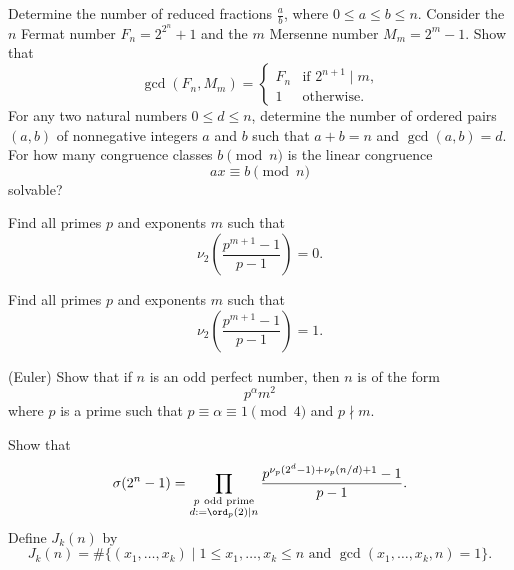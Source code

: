 \begin{challenge}
  \exercise Determine the number of reduced fractions $\tfrac{a}{b}$, where $0\leq a\leq b\leq n$.
  \exercise Consider the $n$\supth{} Fermat number $F_n=2^{2^n}+1$ and the $m$\supth{} Mersenne number $M_m=2^m-1$. Show that
  \begin{equation*}
    \gcd(F_n,M_m)=
    \begin{cases}
      F_n & \text{if $2^{n+1}\mid m$,}\\
      1 & \text{otherwise.}
    \end{cases}
  \end{equation*}
  \exercise For any two natural numbers $0\leq d\leq n$, determine the number of ordered pairs $(a,b)$ of nonnegative integers $a$ and $b$ such that $a+b=n$ and $\gcd(a,b)=d$.
  \exercise For how many congruence classes $b \pmod{n}$ is the linear congruence
  \begin{equation*}
    ax\equiv b\pmod{n}
  \end{equation*}
  solvable?
  \exercise
  \begin{subexenum}
  \item Find all primes $p$ and exponents $m$ such that
    \begin{equation*}
      \nu_2\left(\frac{p^{m+1}-1}{p-1}\right)=0.
    \end{equation*}
  \item Find all primes $p$ and exponents $m$ such that
    \begin{equation*}
      \nu_2\left(\frac{p^{m+1}-1}{p-1}\right)=1.
    \end{equation*}
  \item (Euler) Show that if $n$ is an odd perfect number, then $n$ is of the form
    \begin{equation*}
      p^{\alpha}m^2
    \end{equation*}
    where $p$ is a prime such that $p\equiv \alpha \equiv 1\pmod{4}$ and $p\nmid m$.
  \end{subexenum}
  \exercise Show that
  \begin{equation*}
    \sigma(2^n-1) = \prod_{\substack{p~\text{odd prime}\\d:=\ord_p(2)\mid n}}\frac{p^{\nu_p(2^d-1)+\nu_p(n/d)+1}-1}{p-1}.
  \end{equation*}
  \exercise Define  $J_k(n)$ by
  \begin{equation*}
    J_k(n) = \#\{(x_1,\ldots,x_k)\mid 1\leq x_1,\ldots,x_k\leq n\text{ and }\gcd(x_1,\ldots,x_k,n)=1\}.

\end{equation*}
\end{challenge}
